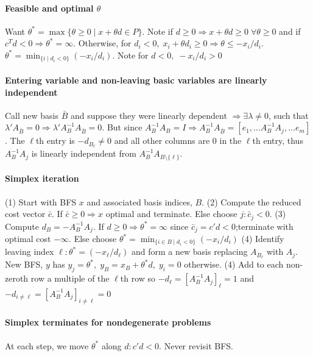 \documentclass{article}
\begin{document}
\paragraph{Feasible and optimal $\theta$} Want $\theta^* = \max\{\theta \geq 0 \mid x + \theta d \in P\}$. Note if $d \geq 0 \Longrightarrow x + \theta d \geq 0\; \forall \theta \geq 0$ and if $c^Td <0 \Longrightarrow \theta^* = \infty$. Otherwise, for $d_i < 0,\; x_i + \theta d_i \geq 0\Rightarrow \theta \leq -x_i/d_i$.  $\theta^* = \min_{\{i\mid d_i < 0\}} (-x_i/d_i)$. Note for $d < 0, \;-x_i / d_i > 0$

\paragraph{Entering variable and non-leaving basic variables are linearly independent} Call new basis $\bar B$ and suppose they were linearly dependent $\Rightarrow \exists \lambda \neq 0$, such that $\lambda' A_{\bar B} = 0 \Rightarrow \lambda'A_B^{-1}A_{\bar B} = 0$. But since $A_B^{-1}A_B = I \Rightarrow A_B^{-1}A_{\bar B} = [e_1,\dots A_B^{-1}A_j,\dots e_m]$. The $\ell$th entry is $-d_{B_\ell} \neq 0$ and all other columns are 0 in the $\ell$th entry, thus $A_B^{-1}A_j$ is linearly independent from $A_B^{-1}A_{B\setminus\{\ell\}}$.

\paragraph{Simplex iteration} (1) Start with BFS $x$ and associated basis indices, $B$. (2) Compute the reduced cost vector $\bar c$. If $\bar c \geq 0 \Rightarrow x$ optimal and terminate. Else choose $j: \bar c_j < 0$. (3) Compute $d_B = -A_B^{-1}A_j$. If $d \geq 0 \Rightarrow \theta^* = \infty$ since $\bar c_j = c'd < 0$;terminate with optimal cost $-\infty$. Else choose $\theta^* = \min_{\{i\in B\mid d_i < 0\}}(-x_i/d_i)$ (4) Identify leaving index $\ell: \theta^* = (-x_{\ell}/d_{\ell})$ and form a new basis replacing $A_{B_\ell}$ with $A_j$. New BFS, $y$ has $y_j = \theta^*,\; y_B = x_B + \theta^*d,\; y_i = 0$ otherwise. (4) Add to each non-zeroth row a multiple of the $\ell$th row so $-d_\ell = [A_B^{-1}A_j]_\ell = 1$ and $-d_{i \neq\ell} = [A_B^{-1}A_j]_{i\neq\ell} = 0$


\paragraph{Simplex terminates for nondegenerate problems} At each step, we move $\theta^*$ along $d: c'd < 0$. Never revisit BFS.
\end{document}
